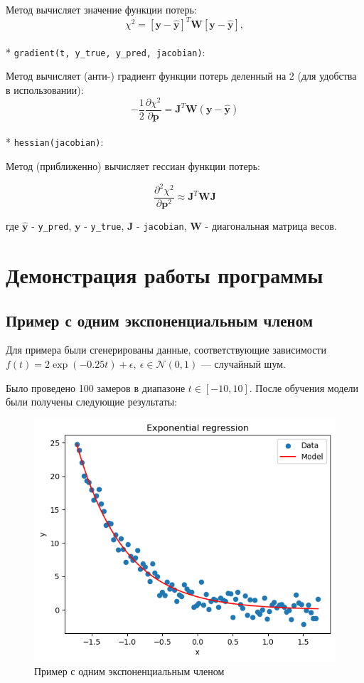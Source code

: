 Метод вычисляет значение функции потерь:
\[
	\chi^2 = \left[\mathbf y - \mathbf{\hat{y}}\right ]^T\mathbf{W}\left[\mathbf y - \mathbf{\hat{y}}\right ],
\]
\\*
\texttt{gradient(t, y\_true, y\_pred, jacobian)}:

Метод вычисляет (анти-) градиент функции потерь деленный на 2 (для удобства в использовании):
\[
	-\frac{1}{2}\frac{\partial\chi^2}{\partial\mathbf{p}} = \mathbf{J}^T\mathbf{W}(\mathbf{y}-\mathbf{\hat{y}})
\]
\\*
\texttt{hessian(jacobian)}:

Метод (приближенно) вычисляет гессиан функции потерь:

\[
	\frac{\partial^2\chi^2}{\partial\mathbf{p}^2} \approx \mathbf{J}^T\mathbf{W}\mathbf{J}
\]

где $\mathbf{\hat{y}}$ - \texttt{y\_pred},  $\mathbf{y}$ - \texttt{y\_true}, $\mathbf{J}$ - \texttt{jacobian}, $\mathbf{W}$ - диагональная матрица весов.


\newpage
\section{Демонстрация работы программы}
\subsection{Пример с одним экспоненциальным членом}

Для примера были сгенерированы данные, соответствующие зависимости $f(t)=2\exp(-0.25t) + \epsilon,\:\epsilon\in\mathcal{N}(0, 1)$ — случайный шум.

Было проведено 100 замеров в диапазоне $t\in[-10, 10]$. После обучения модели были получены следующие результаты:

\begin{figure}[h!]
	\centering
	\includegraphics[width=0.7\linewidth]{../img/ex1.png}
	\caption{Пример с одним экспоненциальным членом}
\end{figure}

